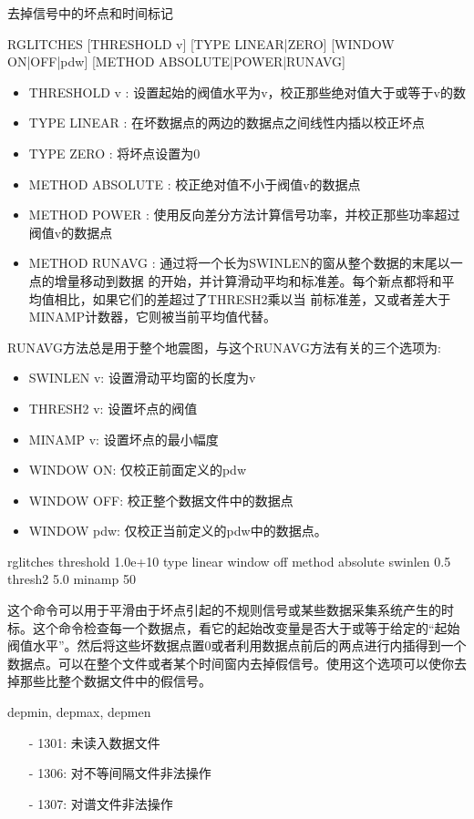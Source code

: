 \label{cmd:rglitches}

去掉信号中的坏点和时间标记

\begin{SACSTX}
RGLITCHES [THRESHOLD v] [TYPE LINEAR|ZERO] [WINDOW ON|OFF|pdw] 
    [METHOD ABSOLUTE|POWER|RUNAVG]
\end{SACSTX}

\begin{itemize}
\item THRESHOLD v : 设置起始的阀值水平为v，校正那些绝对值大于或等于v的数
\item TYPE LINEAR : 在坏数据点的两边的数据点之间线性内插以校正坏点 
\item TYPE ZERO : 将坏点设置为0 
\item METHOD ABSOLUTE : 校正绝对值不小于阀值v的数据点 
\item METHOD POWER : 使用反向差分方法计算信号功率，并校正那些功率超过阀值v的数据点 
\item METHOD RUNAVG : 通过将一个长为SWINLEN的窗从整个数据的末尾以一点的增量移动到数据
    的开始，并计算滑动平均和标准差。每个新点都将和平均值相比，如果它们的差超过了THRESH2乘以当
    前标准差，又或者差大于MINAMP计数器，它则被当前平均值代替。
\end{itemize}
    
RUNAVG方法总是用于整个地震图，与这个RUNAVG方法有关的三个选项为:
\begin{itemize}
\item SWINLEN v: 设置滑动平均窗的长度为v
\item THRESH2 v: 设置坏点的阀值
\item MINAMP  v: 设置坏点的最小幅度
\item WINDOW ON: 仅校正前面定义的pdw
\item WINDOW OFF: 校正整个数据文件中的数据点
\item WINDOW pdw: 仅校正当前定义的pdw中的数据点。
\end{itemize} 

\begin{SACDFT}
rglitches threshold 1.0e+10 type linear window off method absolute 
    swinlen 0.5 thresh2 5.0 minamp 50
\end{SACDFT}

这个命令可以用于平滑由于坏点引起的不规则信号或某些数据采集系统产生的时标。这个命令检查每一个数据点，看它的起始改变量是否大于或等于给定的“起始阀值水平”。然后将这些坏数据点置0或者利用数据点前后的两点进行内插得到一个数据点。可以在整个文件或者某个时间窗内去掉假信号。使用这个选项可以使你去掉那些比整个数据文件中的假信号。

depmin, depmax, depmen

\begin{itemize}
\item[-]1301: 未读入数据文件
\item[-]1306: 对不等间隔文件非法操作
\item[-]1307: 对谱文件非法操作
\end{itemize}
